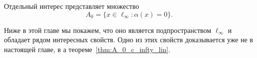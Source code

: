 Отдельный интерес представляет множество
\begin{equation}
	A_0 = \{x\in\ell_\infty : \alpha(x) = 0\}
	.
\end{equation}

Ниже в этой главе мы покажем, что оно является подпространством $\ell_\infty$ и обладает рядом интересных свойств.
Одно из этих свойств доказывается уже не в настоящей главе, в а теореме~\ref{thm:A_0_c_infty_lin}.
